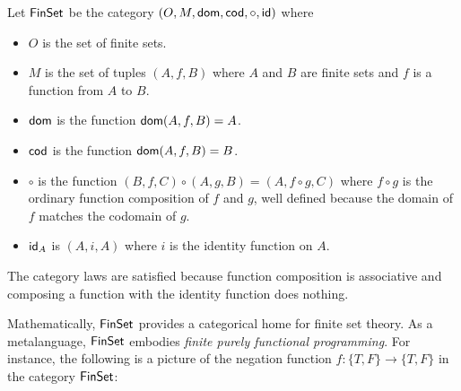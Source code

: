 \begin{definition} \label{def:finset}
  \sloppy
  Let \(\mathsf{FinSet}\) be the category \((O,M,\operatorname{\mathsf{dom}},\operatorname{\mathsf{cod}},\circ,\mathsf{id})\)
  where \begin{itemize}[noitemsep]
  \item \(O\) is the set of finite
    sets.
  \item \(M\) is the set of tuples \((A,f,B)\) where \(A\) and \(B\)
    are finite sets
    and \(f\) is a function from \(A\) to \(B\).
  \item \(\operatorname{\mathsf{dom}}\) is the function \(\operatorname{\mathsf{dom}}(A,f,B) = A\).
  \item \(\operatorname{\mathsf{cod}}\) is the function \(\operatorname{\mathsf{dom}}(A,f,B) = B\).
  \item \(\circ\) is the function \((B,f,C)\circ(A,g,B) = (A,f\circ g,C)\)
    where \(f\circ g\) is the ordinary function composition of \(f\) and \(g\),
    well defined because the domain of \(f\) matches the codomain of \(g\).
  \item \(\mathsf{id}_A\) is \((A,i,A)\) where \(i\) is the identity function on \(A\).
  \end{itemize}
\end{definition}

The category laws are satisfied because function composition is associative
  and composing a function with the identity function does nothing.

Mathematically, \(\mathsf{FinSet}\) provides a categorical home for finite set theory.
As a metalanguage, \(\mathsf{FinSet}\) embodies \emph{finite purely functional programming}.
For instance,
the following is a picture of the negation function \(f : \{T,F\} \to \{T,F\}\) 
in the category \(\mathsf{FinSet}\):

\begin{center}
\end{center}

